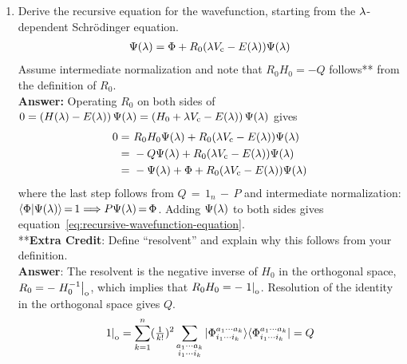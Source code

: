 \documentclass[11pt]{article}
\begin{document}
\begin{enumerate}
\item
Derive the recursive equation for the wavefunction, starting from the $\lambda $-dependent Schr\"odinger equation.
\begin{align}
\label{eq:recursive-wavefunction-equation}
  \Psi (\lambda )
=
  \Phi 
+
  R_0
  (
    \lambda  V_{\mathrm{c}}
  -
    E(\lambda )
  )
  \Psi (\lambda )
\end{align}
Assume intermediate normalization and note that $R_0H_0=-Q$ follows** from the definition of $R_0$.\\[10pt]
\textbf{Answer:}
Operating $R_0$ on both sides of $0=\left(H(\lambda )-E(\lambda )\right)\Psi (\lambda )=\left(H_0 + \lambda  V_{\mathrm{c}}-E(\lambda )\right)\Psi (\lambda )$ gives
\begin{align*}
  0
=&\
  R_0
  H_0
  \Psi (\lambda )
+
  R_0
  (
    \lambda  V_{\mathrm{c}}
  -
    E(\lambda )
  )
  \Psi (\lambda )
\\=&\
-
  Q
  \Psi (\lambda )
+
  R_0
  (
    \lambda  V_{\mathrm{c}}
  -
    E(\lambda )
  )
  \Psi (\lambda )
\\=&\
-
  \Psi (\lambda )
+
  \Phi 
+
  R_0
  (
    \lambda  V_{\mathrm{c}}
  -
    E(\lambda )
  )
  \Psi (\lambda )
\end{align*}
where the last step follows from
$
  Q
\,{=}\,
  1_n
\,{-}\,
  P
$
and intermediate normalization:
$
  \langle\Phi |\Psi (\lambda )\rangle
\,{=}\,
  1
{\implies}
  P\Psi (\lambda )
\,{=}\,
  \Phi 
$.
Adding $\Psi (\lambda )$ to both sides gives equation~\ref{eq:recursive-wavefunction-equation}.\\[10pt]
**\textbf{Extra Credit}: Define ``resolvent'' and explain why this follows from your definition.\\[10pt]
\textbf{Answer}:
The resolvent is the negative inverse of $H_0$ in the orthogonal space,
$
  R_0
=
-
\left.
  H_0^{-1}
\right|_{\mathrm{o}}
$,
which implies that
$
  R_0H_0
=
-
\left.
  1
\right|_{\mathrm{o}}
$.
Resolution of the identity in the orthogonal space gives $Q$.
\begin{align*}
\left.
  1
\right|_{\mathrm{o}}
=
  \sum_{k=1}^n
  (\tfrac{1}{k!})^2
  \sum_{\substack{a_1\cdots a_k\\i_1\cdots i_k}}
  |\Phi ^{a_1\cdots a_k}_{i_1\cdots i_k}\rangle
  \langle\Phi ^{a_1\cdots a_k}_{i_1\cdots i_k}|
=
  Q
\end{align*}


\end{enumerate}
\end{document}
